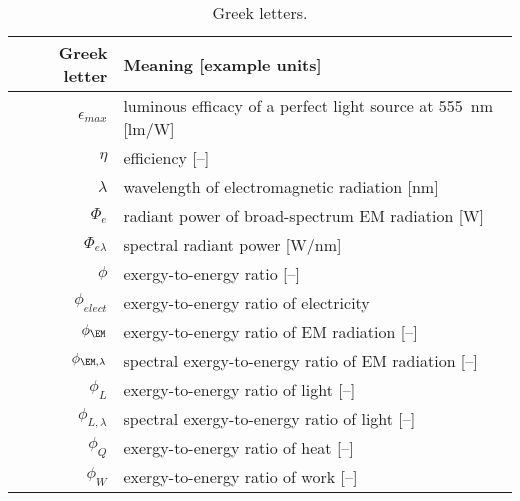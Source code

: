\begin{table}
\centering %
\caption{Greek letters.}
\begin{tabular}{r l}
  \toprule
  Greek letter & Meaning [example units] \\
  \midrule
  $\epsilon_{max}$ & luminous efficacy of a perfect light source at 555~nm [lm/W] \\
  $\eta$ & efficiency [--] \\
  $\lambda$ & wavelength of electromagnetic radiation [nm] \\
  $\Phi_{e}$ & radiant power of broad-spectrum EM radiation [W] \\
  $\Phi_{e\lambda}$ & spectral radiant power [W\!/\!nm] \\
  $\phi$ & exergy-to-energy ratio [--] \\
  $\phi_{elect}$ & exergy-to-energy ratio of electricity \\
  $\phi_{\EM}$ & exergy-to-energy ratio of EM radiation [--] \\
  $\phi_{\EM,\lambda}$ & spectral exergy-to-energy ratio of EM radiation [--] \\
  $\phi_{L}$ & exergy-to-energy ratio of light [--] \\
  $\phi_{L,\lambda}$ & spectral exergy-to-energy ratio of light [--] \\
  $\phi_Q$ & exergy-to-energy ratio of heat [--] \\
  $\phi_W$ & exergy-to-energy ratio of work [--] \\
  \bottomrule
\end{tabular}
\label{tab:greek}
\end{table}


  


  
